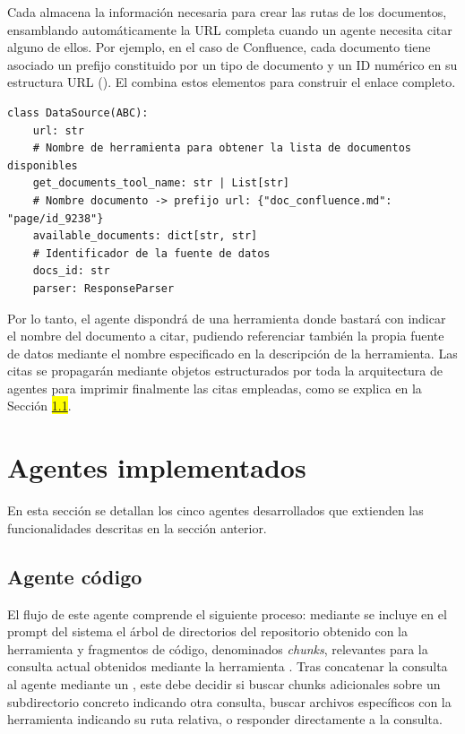 Cada  almacena la información necesaria para crear las rutas de los documentos, ensamblando automáticamente la URL completa cuando un agente necesita citar alguno de ellos. Por ejemplo, en el caso de Confluence, cada documento tiene asociado un prefijo constituido por un tipo de documento y un ID numérico en su estructura URL (). El  combina estos elementos para construir el enlace completo.

\begin{lstlisting}[caption={\protect\opus{DataSource}: clase destinada a almacenar los documentos citables para una fuente de datos}, label={lst:data_src}]
class DataSource(ABC):
    url: str
    # Nombre de herramienta para obtener la lista de documentos disponibles
    get_documents_tool_name: str | List[str]
    # Nombre documento -> prefijo url: {"doc_confluence.md": "page/id_9238"} 
    available_documents: dict[str, str]
    # Identificador de la fuente de datos
    docs_id: str
    parser: ResponseParser
\end{lstlisting}

Por lo tanto, el agente dispondrá de una herramienta donde bastará con indicar el nombre del documento a citar, pudiendo referenciar también la propia fuente de datos mediante el nombre especificado en la descripción de la herramienta. Las citas se propagarán mediante objetos estructurados por toda la arquitectura de agentes para imprimir finalmente las citas empleadas, como se explica en la Sección \colorbox{yellow}{\ref{}}.

\section{Agentes implementados}
En esta sección se detallan los cinco agentes desarrollados que extienden las funcionalidades descritas en la sección anterior.

\subsection{Agente código}
El flujo de este agente comprende el siguiente proceso: mediante  se incluye en el prompt del sistema el árbol de directorios del repositorio obtenido con la herramienta  y fragmentos de código, denominados \textit{chunks}, relevantes para la consulta actual obtenidos mediante la herramienta . Tras concatenar la consulta al agente mediante un , este debe decidir si buscar chunks adicionales sobre un subdirectorio concreto indicando otra consulta, buscar archivos específicos con la herramienta  indicando su ruta relativa, o responder directamente a la consulta.


